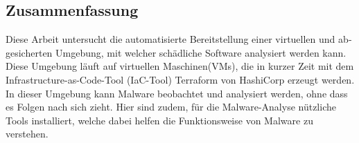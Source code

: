 \newpage
\begin{otherlanguage}{ngerman}
\section*{Zusammenfassung}
Diese Arbeit untersucht die automatisierte Bereitstellung einer virtuellen und abgesicherten Umgebung, mit welcher schädliche Software analysiert werden kann. Diese Umgebung läuft auf virtuellen Maschinen(VMs), die in kurzer Zeit mit dem Infrastructure-as-Code-Tool (IaC-Tool) Terraform von HashiCorp erzeugt werden. In dieser Umgebung kann Malware beobachtet und analysiert werden, ohne dass es Folgen nach sich zieht. Hier sind zudem, für die Malware-Analyse nützliche Tools installiert, welche dabei helfen die Funktionsweise von Malware zu verstehen.
\end{otherlanguage}